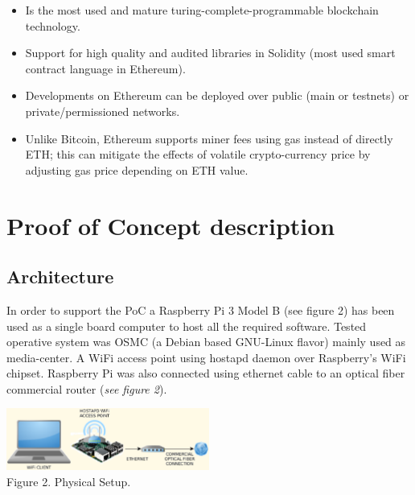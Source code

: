 \documentclass[12pt]{amsart}
\begin{document}
\begin{multicols}{2}
\begin{itemize}
\item Is the most used and mature
turing-complete-programmable blockchain technology.
\item Support for high quality and audited
libraries in Solidity (most used smart contract language in Ethereum).
\item Developments on Ethereum can be deployed
over public (main or testnets) or private/permissioned networks.
\item Unlike Bitcoin, Ethereum supports miner fees using gas
instead of directly ETH; this can mitigate the effects of
volatile crypto-currency price by adjusting gas price depending
on ETH value.
\end{itemize}


\section{Proof of Concept description}

\subsection{Architecture}
\label{ch:architecture}
\vspace{0.35cm}

In order to support the PoC a
Raspberry Pi 3 Model B (see figure 2) has been used
as a single board computer to host all the required software.
Tested operative system was OSMC\cite{osmc} (a Debian based
GNU-Linux flavor) mainly used as media-center.
A WiFi access point using
hostapd\cite{hostapd} daemon over Raspberry's WiFi chipset.
Raspberry Pi was also connected using ethernet cable
to an optical fiber commercial router (\textit{see figure 2}).

\begin{center}
  \includegraphics[keepaspectratio, width=0.5\textwidth]{images/physical-setup-y.eps}
\\
Figure 2. Physical Setup.
\\


\end{center}
\end{multicols}
\end{document}
